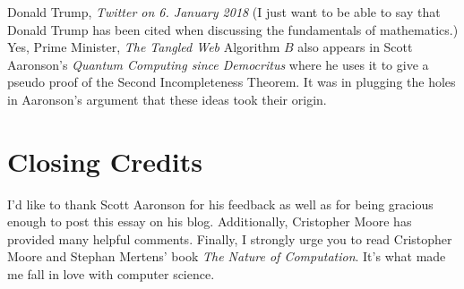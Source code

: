 \documentclass{article}
\theoremstyle{customstyle}
\begin{document}
\begin{thebibliography}{1}
Donald Trump, \textit{Twitter on 6. January 2018} (I just want to be able to say that Donald Trump has been cited when discussing the fundamentals of mathematics.)
Yes, Prime Minister, \textit{The Tangled Web}
 Algorithm $B$ also appears in Scott Aaronson's \textit{Quantum Computing since Democritus} where he uses it to give a pseudo proof of the Second Incompleteness Theorem. It was in plugging the holes in Aaronson's argument that these ideas took their origin.
\end{thebibliography}

\section*{Closing Credits}

I'd like to thank Scott Aaronson for his feedback as well as for being gracious enough to post this essay on his blog. Additionally, Cristopher Moore has provided many helpful comments. Finally, I strongly urge you to read Cristopher Moore and Stephan Mertens' book \textit{The Nature of Computation}. It's what made me fall in love with computer science.

\vfill\eject
\end{document}
